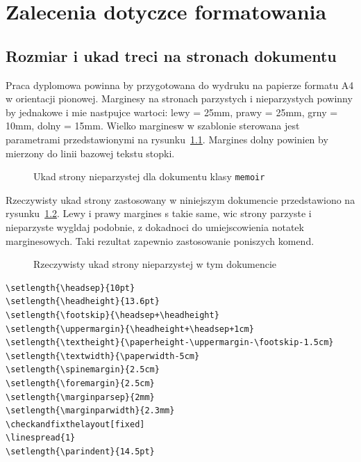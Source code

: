 \chapter{Zalecenia dotyczce formatowania}
\section{Rozmiar i ukad treci na stronach dokumentu}
Praca dyplomowa powinna by przygotowana do wydruku na papierze formatu A4 w orientacji pionowej.
Marginesy na stronach parzystych i nieparzystych powinny by jednakowe i mie nastpujce wartoci:
lewy = 25mm, prawy = 25mm, grny = 10mm, dolny = 15mm. Wielko marginesw w szablonie sterowana jest parametrami przedstawionymi na rysunku~\ref{fig:pageLayout}. Margines dolny powinien by mierzony do linii bazowej tekstu stopki.
\begin{figure}[htb]
\currentpage
\drawparameterstrue
\oddpagelayoutfalse
\drawstock
\caption{Ukad strony nieparzystej dla dokumentu klasy \texttt{memoir}} \label{fig:pageLayout}
\end{figure}

Rzeczywisty ukad strony zastosowany w niniejszym dokumencie przedstawiono na rysunku~\ref{fig:currentPageLayout}. Lewy i prawy margines s takie same, wic strony parzyste i nieparzyste wygldaj podobnie, z dokadnoci do umiejscowienia notatek marginesowych. Taki rezultat zapewnio zastosowanie poniszych komend. 
\begin{figure}[t]
\currentstock
\oddpagelayouttrue
\twocolumnlayoutfalse
\drawmarginparstrue
\drawparametersfalse
\drawstock
\caption{Rzeczywisty ukad strony nieparzystej w tym dokumencie} \label{fig:currentPageLayout}
\end{figure}

\begin{lstlisting}[basicstyle=\footnotesize\ttfamily]
\setlength{\headsep}{10pt} 
\setlength{\headheight}{13.6pt} 
\setlength{\footskip}{\headsep+\headheight}
\setlength{\uppermargin}{\headheight+\headsep+1cm}
\setlength{\textheight}{\paperheight-\uppermargin-\footskip-1.5cm}
\setlength{\textwidth}{\paperwidth-5cm}
\setlength{\spinemargin}{2.5cm}
\setlength{\foremargin}{2.5cm}
\setlength{\marginparsep}{2mm}
\setlength{\marginparwidth}{2.3mm}
\checkandfixthelayout[fixed] 
\linespread{1}
\setlength{\parindent}{14.5pt}
\end{lstlisting}




